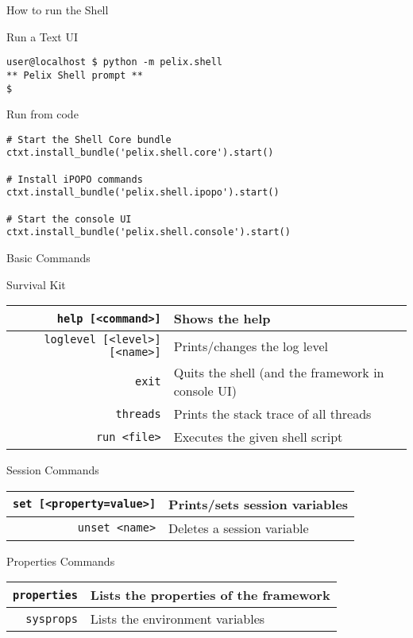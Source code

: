 \begin{frame}[fragile]{How to run the Shell}
\begin{block}{Run a Text UI}
\begin{verbatim}
user@localhost $ python -m pelix.shell
** Pelix Shell prompt **
$
\end{verbatim}
\end{block}

\begin{block}{Run from code}
\begin{verbatim}
# Start the Shell Core bundle
ctxt.install_bundle('pelix.shell.core').start()

# Install iPOPO commands
ctxt.install_bundle('pelix.shell.ipopo').start()

# Start the console UI
ctxt.install_bundle('pelix.shell.console').start()
\end{verbatim}
\end{block}
\end{frame}

\begin{frame}{Basic Commands}
\begin{small}
\begin{block}{Survival Kit}
\centering
\begin{tabular}{r p{}}
\texttt{help {\scriptsize [<command>]}} & Shows the help \\
\hline
\texttt{loglevel {\scriptsize [<level>] [<name>]}} & Prints/changes the log level \\
\hline
\texttt{exit} & Quits the shell (and the framework in console UI) \\
\hline
\texttt{threads} & Prints the stack trace of all threads \\
\hline
\texttt{run {\scriptsize <file>}} & Executes the given shell script \\
\end{tabular}
\end{block}

\begin{block}{Session Commands}
\centering
\begin{tabular}{r l}
\texttt{set {\scriptsize [<property=value>]}} & Prints/sets session variables \\
\hline
\texttt{unset {\scriptsize <name>}} & Deletes a session variable \\
\end{tabular}
\end{block}

\begin{block}{Properties Commands}
\centering
\begin{tabular}{r l}
\texttt{properties} & Lists the properties of the framework \\
\hline
\texttt{sysprops} & Lists the environment variables \\
\end{tabular}
\end{block}
\end{small}
\end{frame}


